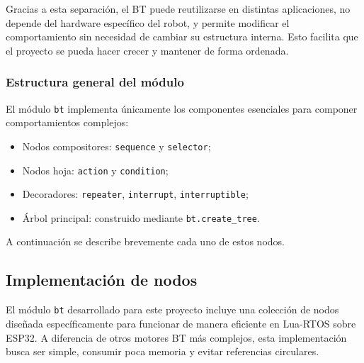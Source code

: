 \documentclass{prgrado}
\begin{document}
Gracias a esta separación, el BT puede reutilizarse en distintas aplicaciones, no depende del hardware específico del robot, y permite modificar el comportamiento sin necesidad de cambiar su estructura interna. Esto facilita que el proyecto se pueda hacer crecer y mantener de forma ordenada.

\subsubsection{Estructura general del módulo}

El módulo \texttt{bt} implementa únicamente los componentes esenciales para componer comportamientos complejos:

\begin{itemize}
    \item Nodos compositores: \texttt{sequence} y \texttt{selector};
    \item Nodos hoja: \texttt{action} y \texttt{condition};
    \item Decoradores: \texttt{repeater}, \texttt{interrupt}, \texttt{interruptible};
    \item Árbol principal: construido mediante \texttt{bt.create\_tree}.
\end{itemize}

A continuación se describe brevemente cada uno de estos nodos.

\subsection{Implementación de nodos}

El módulo \texttt{bt} desarrollado para este proyecto incluye una colección de nodos diseñada específicamente para funcionar de manera eficiente en Lua-RTOS sobre ESP32. A diferencia de otros motores BT más complejos, esta implementación busca ser simple, consumir poca memoria y evitar referencias circulares.
\end{document}
